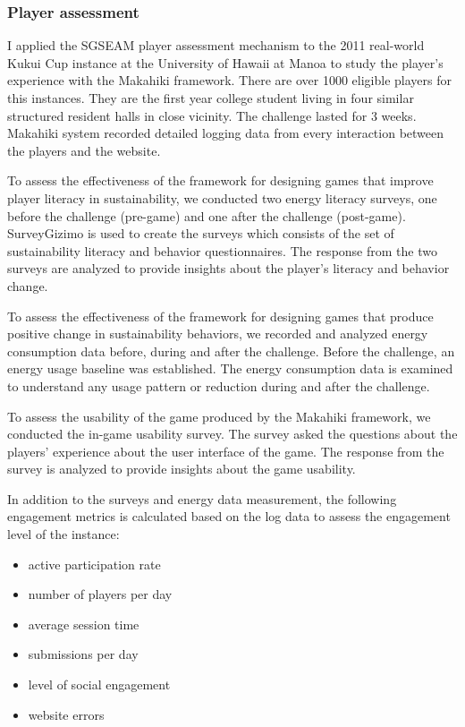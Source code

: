 \subsubsection{Player assessment}

I applied the SGSEAM player assessment mechanism to the 2011 real-world Kukui Cup instance at the University of Hawaii at Manoa to study the player's experience with the Makahiki framework. There are over 1000 eligible players for this instances. They are the first year college student living in four similar structured resident halls in close vicinity. The challenge lasted for 3 weeks. Makahiki system recorded detailed logging data from every interaction between the players and the website.

To assess the effectiveness of the framework for designing games that improve player literacy in sustainability, we
conducted two energy literacy surveys, one before the challenge (pre-game) and one after
the challenge (post-game). SurveyGizimo is used to create the surveys which consists of the set of sustainability literacy and behavior questionnaires. The response from the two surveys are analyzed to provide insights about the player's literacy and behavior change.

To assess the effectiveness of the framework for designing games that produce positive change in sustainability
behaviors, we recorded and analyzed energy consumption data before, during and after the
challenge.  Before the challenge, an energy usage baseline was established. The energy consumption data is examined to understand any usage pattern or reduction during and after the challenge.

To assess the usability of the game produced by the Makahiki framework, we conducted the in-game usability survey. The survey asked the questions about the players' experience about the user interface of the game. The response from the survey is analyzed to provide insights about the game usability.

In addition to the surveys and energy data measurement, the following engagement metrics is calculated based on the log data to assess the engagement level of the instance:

\begin{itemize}
\item active participation rate
\item number of players per day
\item average session time
\item submissions per day
\item level of social engagement
\item website errors
\end{itemize}

